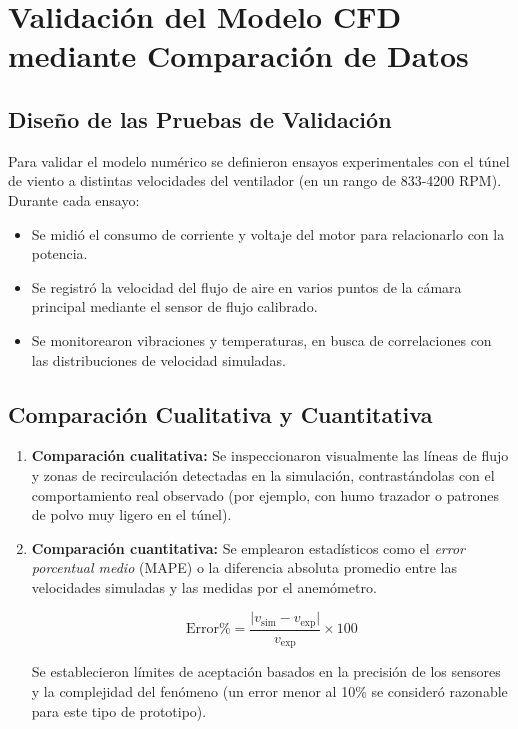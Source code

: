 \section{Validación del Modelo CFD mediante Comparación de Datos}
\subsection{Diseño de las Pruebas de Validación}
Para validar el modelo numérico se definieron ensayos experimentales con el túnel de viento a distintas velocidades del ventilador (en un rango de 833-4200 RPM). Durante cada ensayo:
\begin{itemize}
    \item Se midió el consumo de corriente y voltaje del motor para relacionarlo con la potencia.
    \item Se registró la velocidad del flujo de aire en varios puntos de la cámara principal mediante el sensor de flujo calibrado.
    \item Se monitorearon vibraciones y temperaturas, en busca de correlaciones con las distribuciones de velocidad simuladas.
\end{itemize}

\subsection{Comparación Cualitativa y Cuantitativa}
\begin{enumerate}
    \item \textbf{Comparación cualitativa:} Se inspeccionaron visualmente las líneas de flujo y zonas de recirculación detectadas en la simulación, contrastándolas con el comportamiento real observado (por ejemplo, con humo trazador o patrones de polvo muy ligero en el túnel).
    \item \textbf{Comparación cuantitativa:} Se emplearon estadísticos como el \textit{error porcentual medio} (MAPE) o la diferencia absoluta promedio entre las velocidades simuladas y las medidas por el anemómetro. 

    \begin{equation}
    \text{Error\%} = \frac{\lvert v_{\text{sim}} - v_{\text{exp}} \rvert}{v_{\text{exp}}} \times 100
    \end{equation}

    Se establecieron límites de aceptación basados en la precisión de los sensores y la complejidad del fenómeno (un error menor al 10\% se consideró razonable para este tipo de prototipo).
\end{enumerate}

